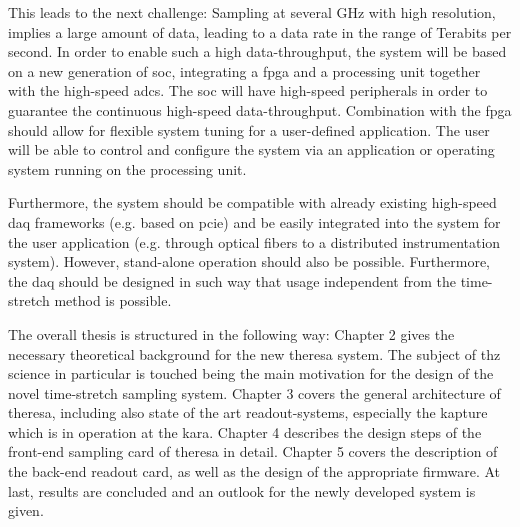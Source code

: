 This leads to the next challenge: Sampling at several \si{\GHz} with high resolution, implies a large amount of data, leading to a data rate in the range of Terabits per second.
In order to enable such a high data-throughput, the system will be based on a new generation of \gls{soc}, integrating a \gls{fpga} and a processing unit together with the high-speed \glspl{adc}. 
The \gls{soc} will have high-speed peripherals in order to guarantee the continuous high-speed data-throughput. 
Combination with the \gls{fpga} should allow for flexible system tuning for a user-defined application.
The user will be able to control and configure the system via an application or operating system running on the processing unit.

Furthermore, the system should be compatible with already existing high-speed \gls{daq} frameworks (e.g. based on \gls{pcie}) and be easily integrated into the system for the user application (e.g. through optical fibers to a distributed instrumentation system). 
However, stand-alone operation should also be possible.
Furthermore, the \gls{daq} should be designed in such way that usage independent from the time-stretch method is possible.


%

The overall thesis is structured in the following way: 
Chapter 2 gives the necessary theoretical background for the new \gls{theresa} system. 
The subject of \gls{thz} science in particular is touched being the main motivation for the design of the novel time-stretch sampling system.
Chapter 3 covers the general architecture of \gls{theresa}, including also state of the art readout-systems, especially the \gls{kapture} which is in operation at the \gls{kara}.
Chapter 4 describes the design steps of the front-end sampling card of \gls{theresa} in detail.
Chapter 5 covers the description of the back-end readout card, as well as the design of the appropriate firmware.
At last, results are concluded and an outlook for the newly developed system is given.


\glsresetall

